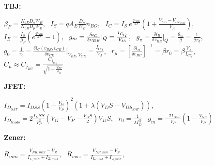\documentclass[a4paper,12pt]{article}
\newenvironment{ecuaciones}[1]{
  \noindent
  \begin{lrbox}{\ecuacionesbox}
  \begin{minipage}{\linewidth}\ignorespaces
  {\footnotesize\textbf{#1:}}
} {
  \end{minipage}
  \end{lrbox}%
  \makebox[\linewidth]{%
  \fbox{\usebox{\ecuacionesbox}}%
  }
  \par
  \vspace{0.5mm}
}
\begin{document}
    \begin{ecuaciones}{TBJ}
    $\beta_F = \frac{N_{dE} D_n W_E}{N_{aB} D_p W_B}
	$, \   
	$I_S = q A_E \frac{D_n}{W_B} n_{BO}
	$, \ 
	$ I_C =  I_S \  e^{ \frac{q V_{BE} }{ k T }}  \left( 1+ \frac{V_{CE}-V_{{CE}_{SAT}}}{V_A} \right)
	$, \ 
	$I_B = \frac{I_S}{\beta_F} ( e^{\frac{q V_{BE} }{kT}} - 1)
	$, \ 
	$\newline g_m = \frac{\delta i_C}{\delta v_{BE}} |_Q = \frac{I_{{C}_Q}}{V_{th}}
	$, \ 
	$g_\pi = \frac{\delta i_B}{\delta v_{BE}} |_Q = \frac{g_m}{\beta} = \frac{1}{\beta r_d}
	$, \ 
	$g_0 = \frac{1}{r_0} = \frac{\delta i_C (v_{BE},v_{CE})}{\delta v_{CE}} |_{V_{BE}, V_{CE}} = \frac{I_{CQ}}{V_A} 
	$, \ 
	$r_\mu = \left[ \frac{\delta i_B}{ \delta v_{DC}}  \right]^{-1} = \beta r_0 = \beta \frac{V_A}{I_{CQ}}
	$, \ 
	$C_\mu \approx C_{j_{BC}} = \frac{C_{j_{BC_0}}}{\sqrt{1+\frac{V_{BC}}{\phi_B}}}
	$
  
    \end{ecuaciones}
    \begin{ecuaciones}{JFET}
    $I_{D_{SAT}} = I_{DSS} (1-\frac{V_G}{V_P})^2 (1+ \lambda (V_DS - V_{{DS}_{SAT}})) 
    $, \ 
      $I_{D_{triodo}} = 2 \frac{I_DSS}{V_P^2}  (V_G - V_P - \frac{V_DS}{2}) V_DS
    $, \ 
    $ r_0 = \frac{1}{\lambda I_D^Q}$ \ 
    $ g_m = \frac{-2 I_{DSS}}{V_P} (1-\frac{V_{GS}}{V_P})$
    \end{ecuaciones}
    \begin{ecuaciones}{Zener}
    $ R_{min} = \frac{V_{N R,max}-V_{Z}}{I_{L,min} + I_{Z,max}}
  $, \
    $R_{maz} = \frac{V_{N R,min}-V_{Z}}{I_{L,max} + I_{Z,min}}
  $, \
    \end{ecuaciones}
\end{document}
